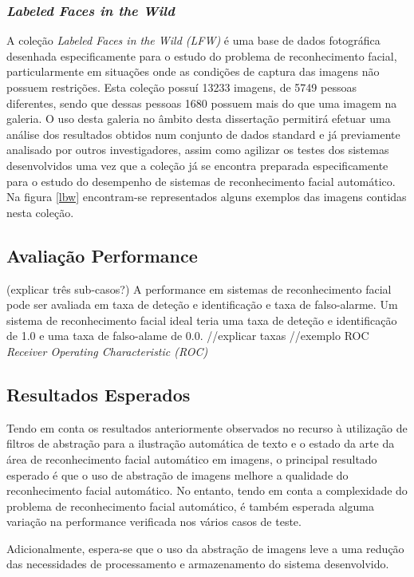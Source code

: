 \subsubsection{\textit{Labeled Faces in the Wild}}
A coleção \textit{Labeled Faces in the Wild (LFW)} é uma base de dados fotográfica desenhada especificamente para o estudo do problema de reconhecimento facial, particularmente em situações onde as condições de captura das imagens não possuem restrições. Esta coleção possuí 13233 imagens, de 5749 pessoas diferentes, sendo que dessas pessoas 1680 possuem mais do que uma imagem na galeria. O uso desta galeria no âmbito desta dissertação permitirá efetuar uma análise dos resultados obtidos num conjunto de dados standard e já previamente analisado por outros investigadores, assim como agilizar os testes dos sistemas desenvolvidos uma vez que a coleção já se encontra preparada especificamente para o estudo do desempenho de sistemas de reconhecimento facial automático. Na figura \ref{lbw} encontram-se representados alguns exemplos das imagens contidas nesta coleção.

\subsection{Avaliação Performance}
(explicar três sub-casos?)
A performance em sistemas de reconhecimento facial pode ser avaliada em taxa de deteção e identificação e taxa de falso-alarme. Um sistema de reconhecimento facial ideal teria uma taxa de deteção e identificação de 1.0 e uma taxa de falso-alame de 0.0.
//explicar taxas
//exemplo ROC 
\textit{Receiver Operating Characteristic (ROC)}



\subsection{Resultados Esperados}
Tendo em conta os resultados anteriormente observados no recurso à utilização de filtros de abstração para a ilustração automática de texto e o estado da arte da área de reconhecimento facial automático em imagens, o principal resultado esperado é que o uso de abstração de imagens melhore a qualidade do reconhecimento facial automático. No entanto, tendo em conta a complexidade do problema de reconhecimento facial automático, é também esperada alguma variação na performance verificada nos vários casos de teste.

Adicionalmente, espera-se que o uso da abstração de imagens leve a uma redução das necessidades de processamento e armazenamento do sistema desenvolvido.

